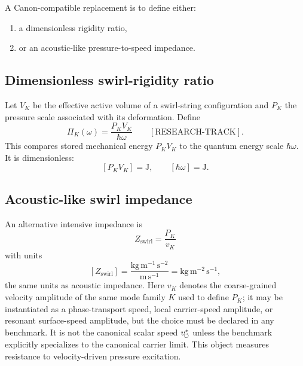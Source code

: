         A Canon-compatible replacement is to define either:
        
        \begin{enumerate}
            \item a dimensionless rigidity ratio,
            \item or an acoustic-like pressure-to-speed impedance.
        \end{enumerate}
    
    \subsection*{Dimensionless swirl-rigidity ratio}
        
        Let \(V_K\) be the effective active volume of a swirl-string configuration and \(P_K\) the pressure scale associated with its deformation. Define
        \begin{equation}
            \boxed{
                \Pi_K(\omega)
                =
                \frac{P_K V_K}{\hbar\omega}
            }
            \qquad
            [\mathrm{RESEARCH\text{-}TRACK}].
            \label{eq:dimensionless_swirl_rigidity}
        \end{equation}
        This compares stored mechanical energy \(P_KV_K\) to the quantum energy scale \(\hbar\omega\). It is dimensionless:
        \[
            [P_KV_K]=\mathrm{J},
            \qquad
            [\hbar\omega]=\mathrm{J}.
        \]
    
    \subsection*{Acoustic-like swirl impedance}
        
        An alternative intensive impedance is
        \begin{equation}
            \boxed{
                Z_{\mathrm{swirl}}
                =
                \frac{P_K}{v_K}
            }
            \label{eq:swirl_acoustic_impedance}
        \end{equation}
        with units
        \[
            [Z_{\mathrm{swirl}}]
            =
            \frac{\mathrm{kg\,m^{-1}\,s^{-2}}}{\mathrm{m\,s^{-1}}}
            =
            \mathrm{kg\,m^{-2}\,s^{-1}},
        \]
        the same units as acoustic impedance. Here $v_K$ denotes the coarse-grained velocity amplitude of the same mode family $K$ used to define $P_K$; it may be instantiated as a phase-transport speed, local carrier-speed amplitude, or resonant surface-speed amplitude, but the choice must be declared in any benchmark. It is not the canonical scalar speed $v_{\!\boldsymbol{\circlearrowleft}}^{\ast}$ unless the benchmark explicitly specializes to the canonical carrier limit. This object measures resistance to velocity-driven pressure excitation.
    
